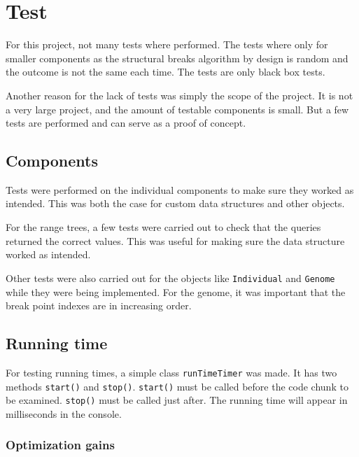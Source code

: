 
\section{Test} \label{sec:test}

For this project, not many tests where performed. The tests where only for
smaller components as the structural breaks algorithm by design is random and
the outcome is not the same each time. The tests are only black box tests. 

Another reason for the lack of tests was simply the scope of the project. It is
not a very large project, and the amount of testable components is small. But a
few tests are performed and can serve as a proof of concept. 

\subsection{Components}

Tests were performed on the individual components to make sure they worked as
intended. This was both the case for custom data structures and other objects. 

For the range trees, a few tests were carried out to check that the queries
returned the correct values. This was useful for making sure the data
structure worked as intended.  

Other tests were also carried out for the objects like \texttt{Individual} and
\texttt{Genome} while they were being implemented. For the genome, it was
important that the break point indexes are in increasing order. 

\subsection{Running time} \label{sec:test-running-time}

For testing running times, a simple class \texttt{runTimeTimer} was made. It has
two methods \texttt{start()} and \texttt{stop()}. \texttt{start()} must be called
before the code chunk to be examined. \texttt{stop()} must be called just after.
The running time will appear in milliseconds in the console.

\subsubsection{Optimization gains} \label{sec:optimization-gains}


